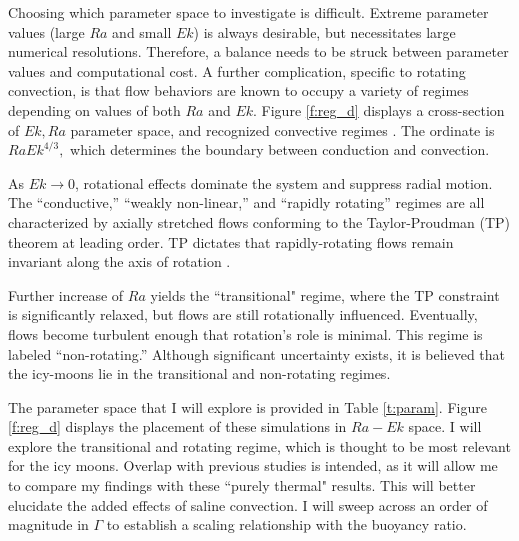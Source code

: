 \documentclass[12pt]{article}
\begin{document}
Choosing which parameter space to investigate is difficult. 
Extreme parameter values (large $Ra$ and small $Ek$) is always desirable, but necessitates large numerical resolutions.  Therefore, a balance needs to be struck between parameter values and computational cost. 
A further complication, specific to rotating convection, is that flow behaviors are known to occupy a variety of regimes depending on values of both $Ra$ and $Ek$\citep{tG16}.
Figure \ref{f:reg_d} displays a cross-section of $Ek,Ra$ parameter space, and recognized convective regimes \citep{tG16}. The ordinate is $RaEk^{4/3},$ which determines the boundary between conduction and convection\citep{sC61}.

As $Ek\rightarrow 0$, rotational effects dominate the system and suppress radial motion. The ``conductive,'' ``weakly non-linear,'' and ``rapidly rotating'' regimes\citep{tG16,kJ12} are all characterized by axially stretched flows conforming to the Taylor-Proudman (TP) theorem at leading order. TP dictates that rapidly-rotating flows remain invariant along the axis of rotation \citep{gB53}.

Further increase of $Ra$ yields the ``transitional" regime, where the TP constraint is significantly relaxed, but flows are still rotationally influenced.
Eventually, flows become turbulent enough that rotation's role is minimal. This regime is labeled ``non-rotating.''
Although significant uncertainty exists, it is believed that the icy-moons lie in the transitional and non-rotating regimes\citep{dL23,tG16}.

The parameter space that I will explore is provided in Table \ref{t:param}. Figure \ref{f:reg_d} displays the placement of these simulations in $Ra-Ek$ space. I will explore the transitional and rotating regime, which is thought to be most relevant for the icy moons.
Overlap with previous studies \citep{dL23,kS19} is intended, as it will allow me to compare my findings with these ``purely thermal" results. This will better elucidate the added effects of saline convection.
I will sweep across an order of magnitude in $\Gamma$ to establish a scaling relationship with the buoyancy ratio. 
\end{document}
